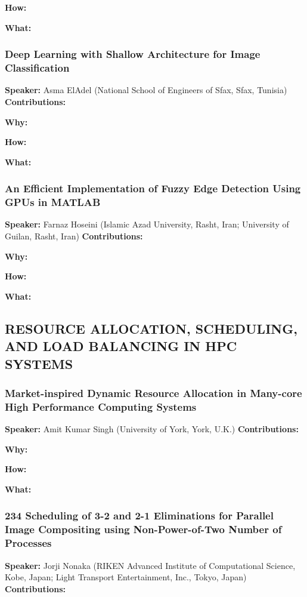 \documentclass[twocolumn]{article}
\begin{document}
\noindent
\textbf{How:}  

\noindent
\textbf{What:}  

\subsubsection{Deep Learning with Shallow Architecture for Image Classification}
\textbf{Speaker:} Asma ElAdel (National School of Engineers of Sfax, Sfax, Tunisia)
\noindent
\textbf{Contributions:}  

\noindent
\textbf{Why:}  

\noindent
\textbf{How:}  

\noindent
\textbf{What:}  

\subsubsection{An Efficient Implementation of Fuzzy Edge Detection Using GPUs in MATLAB}
\textbf{Speaker:} Farnaz Hoseini (Islamic Azad University, Rasht, Iran; University of Guilan, Rasht, Iran)
\noindent
\textbf{Contributions:}  

\noindent
\textbf{Why:}  

\noindent
\textbf{How:}  

\noindent
\textbf{What:}  

\subsection{RESOURCE ALLOCATION, SCHEDULING, AND LOAD BALANCING IN HPC SYSTEMS}
\subsubsection{Market-inspired Dynamic Resource Allocation in Many-core High Performance Computing Systems}
\textbf{Speaker:} Amit Kumar Singh (University of York, York, U.K.)
\noindent
\textbf{Contributions:}  

\noindent
\textbf{Why:}  

\noindent
\textbf{How:}  

\noindent
\textbf{What:}  

\subsubsection{234 Scheduling of 3-2 and 2-1 Eliminations for Parallel Image Compositing using Non-Power-of-Two Number of Processes}
\textbf{Speaker:} Jorji Nonaka (RIKEN Advanced Institute of Computational Science, Kobe, Japan; Light Transport Entertainment, Inc., Tokyo, Japan)
\noindent
\textbf{Contributions:}  
\end{document}
